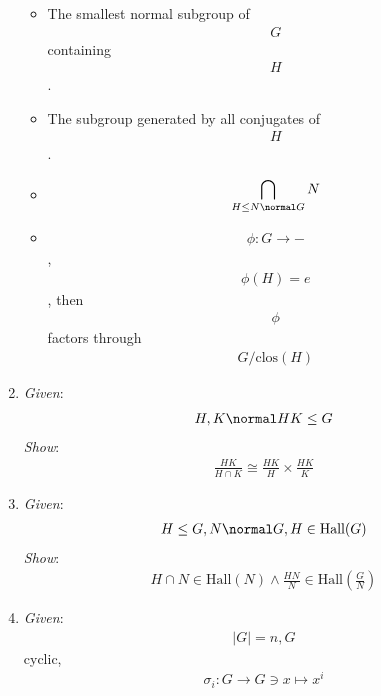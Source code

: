 \begin{enumerate}
  \begin{itemize}
  \tightlist
  \item
    The smallest normal subgroup of \begin{align*}G\end{align*}
    containing \begin{align*}H\end{align*}.
  \item
    The subgroup generated by all conjugates of
    \begin{align*}H\end{align*}.
  \item
    \begin{align*}\bigcap_{H \leq N \normal G} N\end{align*}
  \item
    \begin{align*}\phi: G \rightarrow -\end{align*},
    \begin{align*}\phi(H) = e\end{align*}, then
    \begin{align*}\phi\end{align*} factors through
    \begin{align*}G/\text{clos}(H)\end{align*}
  \end{itemize}
\item
  \emph{Given}: \begin{align*}H, K \normal HK \leq G\end{align*}
  \emph{Show}:
  \begin{align*} \frac{HK}{H\cap K} \cong \frac{HK}{H}\times \frac{HK}{K}\end{align*}
\item
  \emph{Given}:
  \begin{align*}H\leq G, N \normal G, H \in \text{Hall}(G)\end{align*}
  \emph{Show}:
  \begin{align*}H\cap N \in \text{Hall}(N) \wedge \frac{HN}{N} \in \text{Hall}(\frac{G}{N})\end{align*}
\item
  \emph{Given}: \begin{align*}|G| = n, G\end{align*} cyclic,
  \begin{align*}\sigma_i: G \rightarrow G \ni x \mapsto x^i\end{align*}


\end{enumerate}
